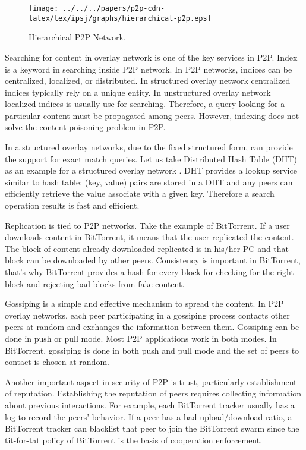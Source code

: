 \begin{figure}[tb]
\begin{center}
\texttt{[image: ../../../papers/p2p-cdn-latex/tex/ipsj/graphs/hierarchical-p2p.eps]}
\end{center}
\caption{Hierarchical P2P Network.} 
\label{fig:hierarchicalp2p}
\end{figure}



Searching for content in overlay network is one of the key services in P2P.
Index is a keyword in searching inside P2P network.
In P2P networks, indices can be centralized, localized, or distributed. 
In structured overlay network centralized indices typically rely on a unique entity.
In unstructured overlay network localized indices is usually use for searching. 
Therefore, a query looking for a particular content must be propagated among peers.
However, indexing does not solve the content poisoning problem in P2P.

In a structured overlay networks, due to the fixed structured form, can provide the support for exact match queries.  
Let us take Distributed Hash Table (DHT) as an example for a structured overlay network \cite{Balakrishnan:2003:LUD:606272.606299}.  
DHT provides a lookup service similar to hash table; (key, value) pairs are stored in a DHT and any peers can efficiently retrieve the value associate with a given key. 
Therefore a search operation results is fast and efficient.

Replication is tied to P2P networks.  
Take the example of BitTorrent.  
If a user downloads content in BitTorrent,  it means that the user replicated the content.  
The block of content  already downloaded replicated is in his/her PC and that block can be downloaded by other peers.
Consistency is important in BitTorrent, that's why BitTorrent provides a hash for every block for checking for the right block and rejecting bad blocks from fake content.

Gossiping is a simple and effective mechanism to spread the content. 
In P2P overlay networks, each peer participating in a gossiping process contacts other peers at random and exchanges the information between them.
Gossiping can be done in push or pull mode.
Most P2P applications work in both modes.
In BitTorrent, gossiping is done in both push and pull mode and the set of peers to contact is chosen at random.

Another important aspect in security of P2P is trust, particularly establishment of reputation. 
Establishing the reputation of peers requires collecting information about previous interactions. 
For example, each BitTorrent tracker usually has a log to record the peers' behavior. 
If a peer has a bad upload/download ratio, a BitTorrent tracker can blacklist that peer to join the BitTorrent swarm since the tit-for-tat policy of BitTorrent is the basis of cooperation enforcement.

